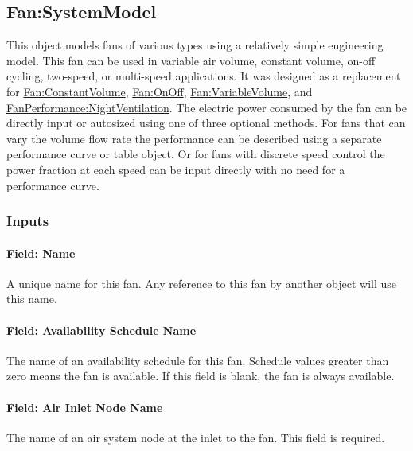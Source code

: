 \subsection{Fan:SystemModel}\label{fansystemmodel}

This object models fans of various types using a relatively simple engineering model. This fan can be used in variable air volume, constant volume, on-off cycling, two-speed, or multi-speed applications.  It was designed as a replacement for \hyperref[fanconstantvolume]{Fan:ConstantVolume}, \hyperref[fanonoff]{Fan:OnOff}, \hyperref[fanvariablevolume]{Fan:VariableVolume}, and \hyperref[fanperformancenightventilation]{FanPerformance:NightVentilation}. The electric power consumed by the fan can be directly input or autosized using one of three optional methods.  For fans that can vary the volume flow rate the performance can be described using a separate performance curve or table object. Or for fans with discrete speed control the power fraction at each speed can be input directly with no need for a performance curve.

\subsubsection{Inputs}\label{inputs-fansysmodel}

\paragraph{Field: Name}\label{field-name-fansysmodel}

A unique name for this fan.  Any reference to this fan by another object will use this name.

\paragraph{Field: Availability Schedule Name}\label{field-availsched-fansysmodel}

The name of an availability schedule for this fan. Schedule values greater than zero means the fan is available. If this field is blank, the fan is always available.

\paragraph{Field: Air Inlet Node Name}\label{field-air-inlet-node-name-fansysmodel}

The name of an air system node at the inlet to the fan. This field is required.

